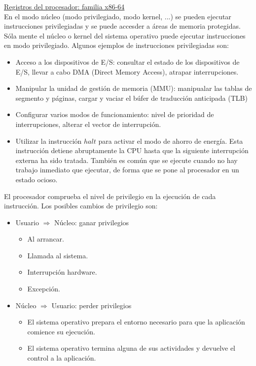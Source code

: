 \documentclass{article}
\begin{document}
\href{https://upload.wikimedia.org/wikipedia/commons/4/41/Table_of_x86_Registers.png}{Registros del procesador: familia x86-64} \\

En el modo núcleo (modo privilegiado, modo kernel, ...) se pueden ejecutar instrucciones privilegiadas y se puede accesder a áreas de memoria protegidas. Sóla mente el núcleo o kernel del sistema operativo puede ejecutar instrucciones en modo privilegiado. Algunos ejemplos de instrucciones privilegiadas son:

\begin{itemize}
\item Acceso a los dispositivos de E/S: consultar el estado de los dispositivos de E/S, llevar a cabo DMA (Direct Memory Access), atrapar interrupciones.

\item Manipular la unidad de gestión de memoria (MMU): manipualar las tablas de segmento y páginas, cargar y vaciar el búfer de traducción anticipada (TLB)

\item Configurar varios modos de funcionamiento: nivel de prioridad de interrupciones, alterar el vector de interrupción.

\item Utilizar la instrucción $halt$ para activar el modo de ahorro de energía. Esta instrucción detiene abruptamente la CPU hasta que la siguiente interrupción externa ha sido tratada. También es común que se ejecute cuando no hay trabajo inmediato que ejecutar, de forma que se pone al procesador en un estado ocioso.
\end{itemize}

El procesador comprueba el nivel de privilegio en la ejecución de cada instrucción. Los posibles cambios de privilegio son:

\begin{itemize}
\item Usuario $\Rightarrow$ Núcleo: ganar privilegios
	\begin{itemize}
	\item Al arrancar.
	\item Llamada al sistema.
	\item Interrupción hardware.
	\item Excepción.
	\end{itemize}
	
\item Núcleo $\Rightarrow$ Usuario: perder privilegios
	\begin{itemize}
	\item El sistema operativo prepara el entorno necesario para que la aplicación comience su ejecución.
	
	\item El sistema operativo termina alguna de sus actividades y devuelve el control a la aplicación.
	\end{itemize}
\end{itemize}
\end{document}

